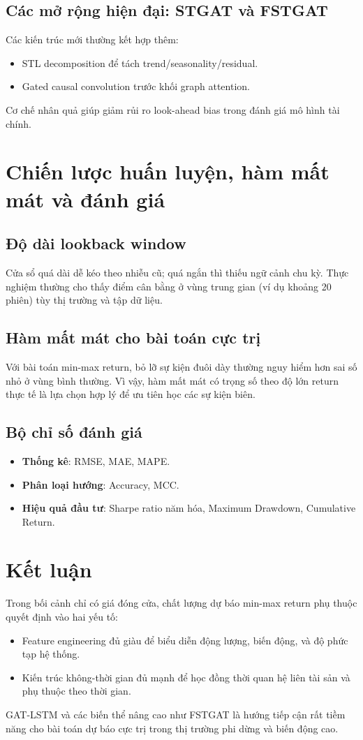 \documentclass[12pt,a4paper]{article}
\begin{document}
\subsection{Các mở rộng hiện đại: STGAT và FSTGAT}
Các kiến trúc mới thường kết hợp thêm:
\begin{itemize}[leftmargin=1.5em]
  \item STL decomposition để tách trend/seasonality/residual.
  \item Gated causal convolution trước khối graph attention.
\end{itemize}
Cơ chế nhân quả giúp giảm rủi ro look-ahead bias trong đánh giá mô hình tài chính.

\section{Chiến lược huấn luyện, hàm mất mát và đánh giá}
\subsection{Độ dài lookback window}
Cửa sổ quá dài dễ kéo theo nhiễu cũ; quá ngắn thì thiếu ngữ cảnh chu kỳ. Thực nghiệm thường cho thấy điểm cân bằng ở vùng trung gian (ví dụ khoảng 20 phiên) tùy thị trường và tập dữ liệu.

\subsection{Hàm mất mát cho bài toán cực trị}
Với bài toán min-max return, bỏ lỡ sự kiện đuôi dày thường nguy hiểm hơn sai số nhỏ ở vùng bình thường. Vì vậy, hàm mất mát có trọng số theo độ lớn return thực tế là lựa chọn hợp lý để ưu tiên học các sự kiện biên.

\subsection{Bộ chỉ số đánh giá}
\begin{itemize}[leftmargin=1.5em]
  \item \textbf{Thống kê}: RMSE, MAE, MAPE.
  \item \textbf{Phân loại hướng}: Accuracy, MCC.
  \item \textbf{Hiệu quả đầu tư}: Sharpe ratio năm hóa, Maximum Drawdown, Cumulative Return.
\end{itemize}

\section{Kết luận}
Trong bối cảnh chỉ có giá đóng cửa, chất lượng dự báo min-max return phụ thuộc quyết định vào hai yếu tố:
\begin{itemize}[leftmargin=1.5em]
  \item Feature engineering đủ giàu để biểu diễn động lượng, biến động, và độ phức tạp hệ thống.
  \item Kiến trúc không-thời gian đủ mạnh để học đồng thời quan hệ liên tài sản và phụ thuộc theo thời gian.
\end{itemize}

GAT-LSTM và các biến thể nâng cao như FSTGAT là hướng tiếp cận rất tiềm năng cho bài toán dự báo cực trị trong thị trường phi dừng và biến động cao.
\end{document}
